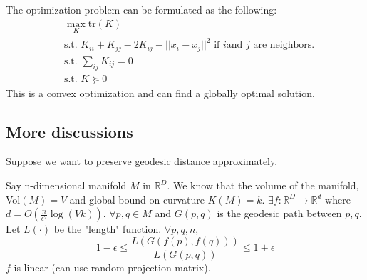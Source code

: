 The optimization problem can be formulated as the following:
\begin{align*}
&\max_{K} \text{tr}(K)\\
&\text{s.t. } K_{ii}+K_{jj}-2K_{ij}-||x_i-x_j||^2 \text{ if }i \text{
    and } j \text{ are neighbors}.\\ 
&\text{s.t. } \sum_{ij}K_{ij}=0\\
&\text{s.t. } K \succeq 0
\end{align*}
This is a convex optimization and can find a globally optimal solution.

\subsection*{More discussions}
Suppose we want to preserve geodesic distance approximately.
\begin{theorem}[JL-manifold]
Say n-dimensional manifold $M$ in $\mathbb{R}^D$. We know that the
volume of the manifold, Vol$(M)=V$ and global bound on curvature
$K(M)=k$. $\exists f: \mathbb{R}^D \rightarrow \mathbb{R}^d$ where
$d=O(\frac{n}{\epsilon^2}\log (Vk) )$. $\forall p,q \in M$ and
$G(p,q)$ is the geodesic path between $p,q$. Let $L(\cdot)$ be the
"length" function. $\forall p,q,n$, 
\[
1-\epsilon \leq \frac{L(G(f(p),f(q)))}{L(G(p,q))} \leq 1+\epsilon
\]
$f$ is linear (can use random projection matrix).
\end{theorem}
